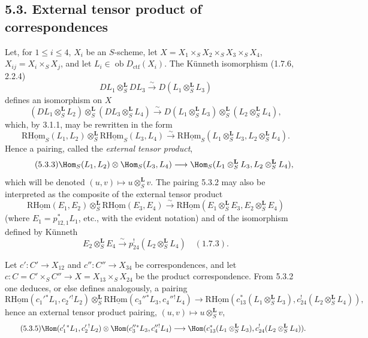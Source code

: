 \subsection*{5.3. External tensor product of correspondences}

Let, for $1\leq i\leq 4$, $X_i$ be an $S$-scheme, let $X=X_1\times_SX_2\times_SX_3\times_SX_4$, $X_{ij}=X_i\times_SX_j$, and let $L_i\in\operatorname{ob}D_{\mathrm{ctf}}(X_i)$. The Künneth isomorphism (1.7.6, 2.2.4)
\[
DL_1\otimes_S^{\mathbf L}DL_3\xrightarrow{\sim}D(L_1\otimes_S^{\mathbf L}L_3)
\]
defines an isomorphism on $X$
\begin{equation}
\tag{5.3.1}
(DL_1\otimes_S^{\mathbf L}L_2)\otimes_S^{\mathbf L}(DL_3\otimes_S^{\mathbf L}L_4)
\xrightarrow{\sim}D(L_1\otimes_S^{\mathbf L}L_3)\otimes_S^{\mathbf L}(L_2\otimes_S^{\mathbf L}L_4),
\end{equation}
which, by 3.1.1, may be rewritten in the form
\begin{equation}
\tag{5.3.2}
\mathrm{R}\underline{\mathrm{Hom}}_S(L_1,L_2)\otimes_S^{\mathbf L}\mathrm{R}\underline{\mathrm{Hom}}_S(L_3,L_4)
\xrightarrow{\sim}\mathrm{R}\underline{\mathrm{Hom}}_S(L_1\otimes_S^{\mathbf L}L_3,L_2\otimes_S^{\mathbf L}L_4).
\end{equation}
Hence a pairing, called the \emph{external tensor product},
\begin{equation}
\tag{5.3.3}
\Hom_S(L_1,L_2)\otimes\Hom_S(L_3,L_4)
\longrightarrow\Hom_S(L_1\otimes_S^{\mathbf L}L_3,L_2\otimes_S^{\mathbf L}L_4),
\end{equation}
which will be denoted $(u,v)\mapsto u\otimes_S^{\mathbf L}v$. The pairing 5.3.2 may also be interpreted as the composite of the external tensor product
\[
\mathrm{R}\underline{\mathrm{Hom}}(E_1,E_2)\otimes_S^{\mathbf L}\mathrm{R}\underline{\mathrm{Hom}}(E_3,E_4)
\xrightarrow{\sim}\mathrm{R}\underline{\mathrm{Hom}}(E_1\otimes_S^{\mathbf L}E_3,E_2\otimes_S^{\mathbf L}E_4)
\]
(where $E_1=p_{12,1}^*L_1$, etc., with the evident notation) and of the isomorphism defined by Künneth
\[
E_2\otimes_S^{\mathbf L}E_4\xrightarrow{\sim}p_{24}^!(L_2\otimes_S^{\mathbf L}L_4)\quad (1.7.3).
\]

Let $c':C'\to X_{12}$ and $c'':C''\to X_{34}$ be correspondences, and let $c:C=C'\times_SC''\to X=X_{13}\times_SX_{24}$ be the product correspondence. From 5.3.2 one deduces, or else defines analogously, a pairing
\begin{equation}
\tag{5.3.4}
\mathrm{R}\underline{\mathrm{Hom}}(c_1'{}^*L_1,c_2'{}^!L_2)\otimes_S^{\mathbf L}\mathrm{R}\underline{\mathrm{Hom}}(c_3''{}^*L_3,c_4''{}^!L_4)
\longrightarrow\mathrm{R}\underline{\mathrm{Hom}}(c_{13}^*(L_1\otimes_S^{\mathbf L}L_3),c_{24}^!(L_2\otimes_S^{\mathbf L}L_4)),
\end{equation}
hence an external tensor product pairing, $(u,v)\mapsto u\otimes_S^{\mathbf L}v$,
\begin{equation}
\tag{5.3.5}
\Hom(c_1'{}^*L_1,c_2'{}^!L_2)\otimes\Hom(c_3''{}^*L_3,c_4''{}^!L_4)
\longrightarrow\Hom(c_{13}^*(L_1\otimes_S^{\mathbf L}L_3),c_{24}^!(L_2\otimes_S^{\mathbf L}L_4)).
\end{equation}

